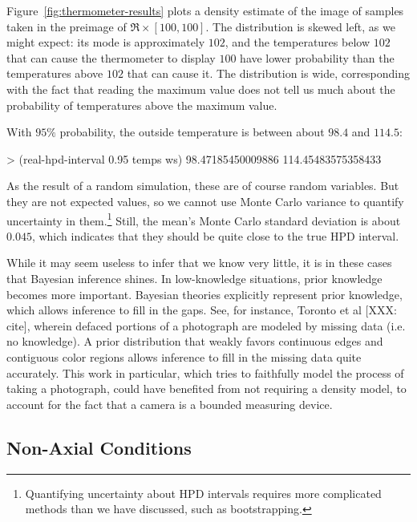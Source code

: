 Figure~\ref{fig:thermometer-results} plots a density estimate of the image of samples taken in the preimage of $\Re \times [100,100]$.
The distribution is skewed left, as we might expect: its mode is approximately $102$, and the temperatures below $102$ that can cause the thermometer to display $100$ have lower probability than the temperatures above $102$ that can cause it.
The distribution is wide, corresponding with the fact that reading the maximum value does not tell us much about the probability of temperatures above the maximum value.

With $95\%$ probability, the outside temperature is between about $98.4$ and $114.5$:
\begin{center}\singlespacing
\begin{schemedisplay}
> (real-hpd-interval 0.95 temps ws)
98.47185450009886
114.45483575358433
\end{schemedisplay}
\end{center}
As the result of a random simulation, these are of course random variables.
But they are not expected values, so we cannot use Monte Carlo variance to quantify uncertainty in them.\footnote{Quantifying uncertainty about HPD intervals requires more complicated methods than we have discussed, such as bootstrapping.}
Still, the mean's Monte Carlo standard deviation is about $0.045$, which indicates that they should be quite close to the true HPD interval.

While it may seem useless to infer that we know very little, it is in these cases that Bayesian inference shines.
In low-knowledge situations, prior knowledge becomes more important.
Bayesian theories explicitly represent prior knowledge, which allows inference to fill in the gaps.
See, for instance, Toronto et al [XXX: cite], wherein defaced portions of a photograph are modeled by missing data (i.e. no knowledge).
A prior distribution that weakly favors continuous edges and contiguous color regions allows inference to fill in the missing data quite accurately.
This work in particular, which tries to faithfully model the process of taking a photograph, could have benefited from not requiring a density model, to account for the fact that a camera is a bounded measuring device.


\subsection{Non-Axial Conditions}


